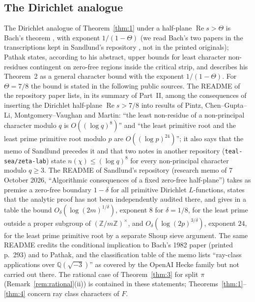 \documentclass[11pt]{article}
\theoremstyle{definition}
\theoremstyle{remark}
\numberwithin{equation}{section}
\newcommand{\Q}{\mathbb Q}
\newcommand{\Z}{\mathbb Z}
\newcommand{\Rea}{\operatorname{Re}}
\begin{document}
\subsection{The Dirichlet analogue}\label{sec:dirichlet}
The Dirichlet analogue of Theorem~\ref{thm:1} under a half-plane $\Rea s>\Theta$ is Bach's theorem \cite{bach1982}, with exponent $1/(1-\Theta)$ (we read Bach's two papers in the transcriptions kept in Sandlund's repository \cite{sandlund2026}, not in the printed originals); Pathak \cite{pathak2024} states, according to his abstract, upper bounds for least character non-residues contingent on zero-free regions inside the critical strip, and \cite{sandlund2026} describes his Theorem~2 as a general character bound with the exponent $1/(1-\Theta)$. For $\Theta=7/8$ the bound is stated in the following public sources. The README of the repository paper \cite{guo2026lg} lists, in its summary of Part~II, among the consequences of inserting the Dirichlet half-plane $\Rea s>7/8$ into results of Pintz, Chen--Gupta--Li, Montgomery--Vaughan and Martin: ``the least non-residue of a non-principal character modulo $q$ is $O((\log q)^8)$'' and ``the least primitive root and the least prime primitive root modulo $p$ are $O((\log p)^{24})$''; it also says that the memo of Sandlund precedes it and that two notes in another repository (\texttt{teal-sea/zeta-lab}) state $n(\chi)\le(\log q)^8$ for every non-principal character modulo $q\ge3$. The README of Sandlund's repository \cite{sandlund2026} (research memo of 7 October 2026, ``Algorithmic consequences of a fixed zero-free half-plane'') takes as premise a zero-free boundary $1-\delta$ for all primitive Dirichlet $L$-functions, states that the analytic proof has not been independently audited there, and gives in a table the bound $O_\delta(\log(2m)^{1/\delta})$, exponent $8$ for $\delta=1/8$, for the least prime outside a proper subgroup of $(\Z/m\Z)^\times$, and $O_\delta(\log(2p)^{3/\delta})$, exponent $24$, for the least prime primitive root by a separate Shoup sieve argument. The same README credits the conditional implication to Bach's 1982 paper (printed p.~293) and to Pathak, and the classification table of the memo lists ``ray-class applications over $\Q(\sqrt{-3})$'' as covered by the OpenAI Hecke family but not carried out there. The rational case of Theorem~\ref{thm:3} for split $\pi$ (Remark~\ref{rem:rational}(ii)) is contained in these statements; Theorems~\ref{thm:1}--\ref{thm:4} concern ray class characters of $F$.
\end{document}
